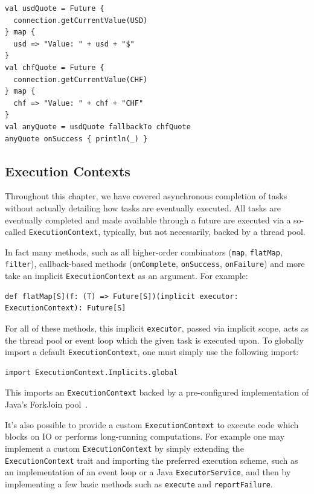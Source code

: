\begin{minipage}{\linewidth}
\begin{verbatim}
val usdQuote = Future {
  connection.getCurrentValue(USD)
} map {
  usd => "Value: " + usd + "$"
}
val chfQuote = Future {
  connection.getCurrentValue(CHF)
} map {
  chf => "Value: " + chf + "CHF"
}
val anyQuote = usdQuote fallbackTo chfQuote
anyQuote onSuccess { println(_) }
\end{verbatim}
\end{minipage}

\subsection{Execution Contexts}
\label{sec:execution-ctx}

Throughout this chapter, we have covered asynchronous completion of tasks
without actually detailing how tasks are eventually executed. All tasks are
eventually completed and made available through a future are executed via a
so-called \verb|ExecutionContext|, typically, but not necessarily, backed by a
thread pool.

In fact many methods, such as all higher-order combinators (\verb|map|,
\verb|flatMap|, \verb|filter|), callback-based methods (\verb|onComplete|,
\verb|onSuccess|, \verb|onFailure|) and more take an implicit
\verb|ExecutionContext| as an argument. For example:

\begin{verbatim}
def flatMap[S](f: (T) => Future[S])(implicit executor: ExecutionContext): Future[S]
\end{verbatim}

For all of these methods, this implicit \verb|executor|, passed via implicit
scope, acts as the thread pool or event loop which the given task is executed
upon. To globally import a default \verb|ExecutionContext|, one must simply use
the following import:

\begin{verbatim}
import ExecutionContext.Implicits.global
\end{verbatim}

This imports an \verb|ExecutionContext| backed by a pre-configured
implementation of Java's ForkJoin pool~\cite{ForkJoin}.

It's also possible to provide a custom \verb|ExecutionContext| to execute code
which blocks on IO or performs long-running computations. For example one may
implement a custom \verb|ExecutionContext| by simply extending the
\verb|ExecutionContext| trait and importing the preferred execution scheme, such
as an implementation of an event loop or a Java \verb|ExecutorService|, and then
by  implementing a few basic methods such as \verb|execute| and
\verb|reportFailure|.

